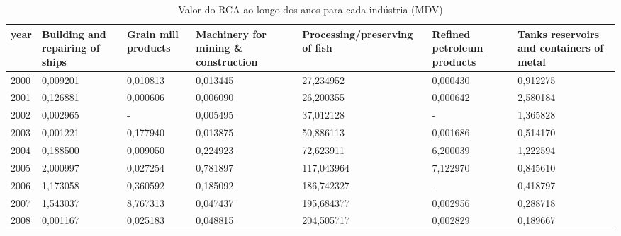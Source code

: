 \begin{table}
\centering
\caption{Valor do RCA ao longo dos anos para cada indústria (MDV)}
\begin{tabular}{p{1cm}p{2cm}p{2cm}p{2cm}p{2cm}p{2cm}p{2cm}}
\toprule
 year &  Building and repairing of ships &  Grain mill products &  Machinery for mining \& construction &  Processing/preserving of fish &  Refined petroleum products &  Tanks reservoirs and containers of metal \\
\midrule
 2000 &                         0,009201 &             0,010813 &                             0,013445 &                      27,234952 &                    0,000430 &                                  0,912275 \\
 2001 &                         0,126881 &             0,000606 &                             0,006090 &                      26,200355 &                    0,000642 &                                  2,580184 \\
 2002 &                         0,002965 &                    - &                             0,005495 &                      37,012128 &                           - &                                  1,365828 \\
 2003 &                         0,001221 &             0,177940 &                             0,013875 &                      50,886113 &                    0,001686 &                                  0,514170 \\
 2004 &                         0,188500 &             0,009050 &                             0,224923 &                      72,623911 &                    6,200039 &                                  1,222594 \\
 2005 &                         2,000997 &             0,027254 &                             0,781897 &                     117,043964 &                    7,122970 &                                  0,845610 \\
 2006 &                         1,173058 &             0,360592 &                             0,185092 &                     186,742327 &                           - &                                  0,418797 \\
 2007 &                         1,543037 &             8,767313 &                             0,047437 &                     195,684377 &                    0,002956 &                                  0,288718 \\
 2008 &                         0,001167 &             0,025183 &                             0,048815 &                     204,505717 &                    0,002829 &                                  0,189667 \\

\end{tabular}
\end{table}
